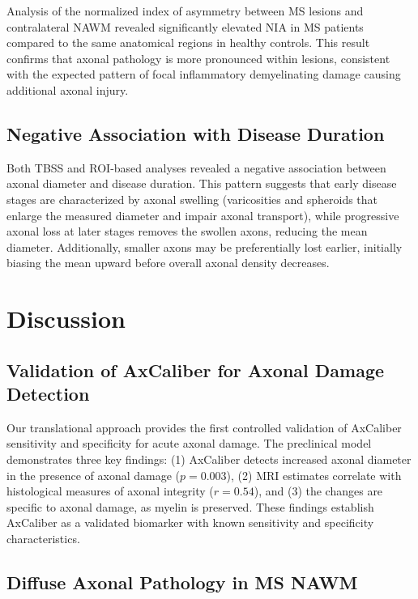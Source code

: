 \documentclass[11pt]{article}
\begin{document}
Analysis of the normalized index of asymmetry between MS lesions and contralateral NAWM revealed significantly elevated NIA in MS patients compared to the same anatomical regions in healthy controls. This result confirms that axonal pathology is more pronounced within lesions, consistent with the expected pattern of focal inflammatory demyelinating damage causing additional axonal injury.

\subsection{Negative Association with Disease Duration}

Both TBSS and ROI-based analyses revealed a negative association between axonal diameter and disease duration. This pattern suggests that early disease stages are characterized by axonal swelling (varicosities and spheroids that enlarge the measured diameter and impair axonal transport), while progressive axonal loss at later stages removes the swollen axons, reducing the mean diameter. Additionally, smaller axons may be preferentially lost earlier, initially biasing the mean upward before overall axonal density decreases.

\section{Discussion}

\subsection{Validation of AxCaliber for Axonal Damage Detection}

Our translational approach provides the first controlled validation of AxCaliber sensitivity and specificity for acute axonal damage. The preclinical model demonstrates three key findings: (1) AxCaliber detects increased axonal diameter in the presence of axonal damage ($p = 0.003$), (2) MRI estimates correlate with histological measures of axonal integrity ($r = 0.54$), and (3) the changes are specific to axonal damage, as myelin is preserved. These findings establish AxCaliber as a validated biomarker with known sensitivity and specificity characteristics.

\subsection{Diffuse Axonal Pathology in MS NAWM}
\end{document}
